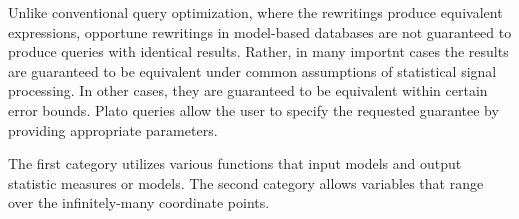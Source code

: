 Unlike conventional query optimization, where the rewritings produce equivalent expressions, opportune rewritings in model-based databases are not guaranteed to produce queries with identical results. Rather, in many importnt cases the results are guaranteed to be equivalent under common assumptions of statistical signal processing. In other cases, they are guaranteed to be equivalent within certain error bounds. Plato queries allow the user to specify the requested guarantee by providing appropriate parameters.

The first category utilizes various functions that input models and output statistic measures or models. The second category allows variables that range over the infinitely-many coordinate points. 


